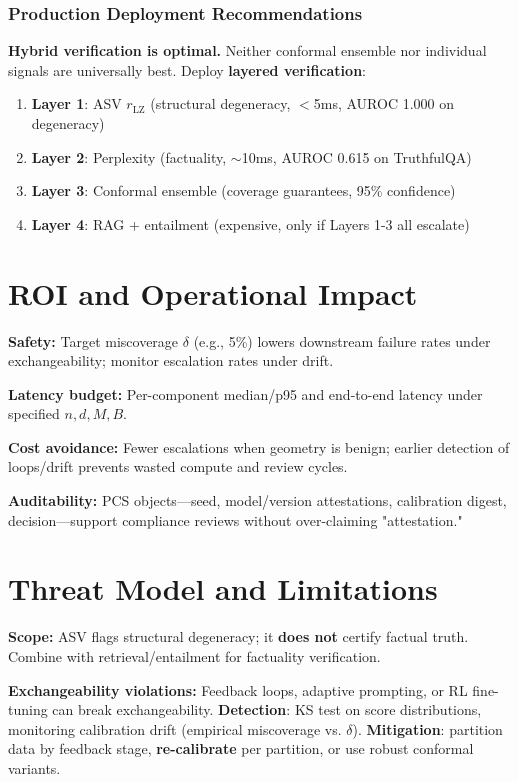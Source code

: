 \documentclass[10pt]{article}
\begin{document}
\subsubsection{Production Deployment Recommendations}

\textbf{Hybrid verification is optimal.} Neither conformal ensemble nor individual signals are universally best. Deploy \textbf{layered verification}:
\begin{enumerate}
\item \textbf{Layer 1}: ASV $r_{\text{LZ}}$ (structural degeneracy, $<$5ms, AUROC 1.000 on degeneracy)
\item \textbf{Layer 2}: Perplexity (factuality, $\sim$10ms, AUROC 0.615 on TruthfulQA)
\item \textbf{Layer 3}: Conformal ensemble (coverage guarantees, 95\% confidence)
\item \textbf{Layer 4}: RAG + entailment (expensive, only if Layers 1-3 all escalate)
\end{enumerate}

\section{ROI and Operational Impact}
\label{sec:roi}

\textbf{Safety:} Target miscoverage $\delta$ (e.g., 5\%) lowers downstream failure rates under exchangeability; monitor escalation rates under drift.

\textbf{Latency budget:} Per-component median/p95 and end-to-end latency under specified $n, d, M, B$.

\textbf{Cost avoidance:} Fewer escalations when geometry is benign; earlier detection of loops/drift prevents wasted compute and review cycles.

\textbf{Auditability:} PCS objects---seed, model/version attestations, calibration digest, decision---support compliance reviews without over-claiming "attestation."

\section{Threat Model and Limitations}
\label{sec:limitations}

\textbf{Scope:} ASV flags structural degeneracy; it \textbf{does not} certify factual truth. Combine with retrieval/entailment for factuality verification.

\textbf{Exchangeability violations:} Feedback loops, adaptive prompting, or RL fine-tuning can break exchangeability. \textbf{Detection}: KS test on score distributions, monitoring calibration drift (empirical miscoverage vs. $\delta$). \textbf{Mitigation}: partition data by feedback stage, \textbf{re-calibrate} per partition, or use robust conformal variants.
\end{document}
